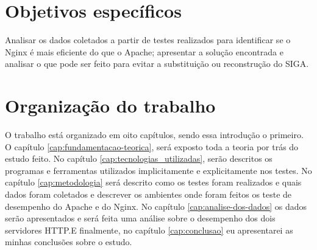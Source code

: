 \section{Objetivos específicos}
Analisar os dados coletados a partir de testes realizados para identificar se o 
Nginx é mais eficiente do que o Apache; apresentar a solução encontrada e 
analisar o que pode ser feito para evitar a substituição ou reconstrução do 
SIGA.\\
\section{Organização do trabalho}
O trabalho está organizado em oito capítulos, sendo essa introdução o primeiro. 
O capítulo \ref{cap:fundamentacao-teorica}, será exposto toda a teoria por trás 
do estudo feito. No capítulo \ref{cap:tecnologias_utilizadas}, serão descritos 
os programas e ferramentas utilizados implicitamente e explicitamente nos 
testes. No capítulo \ref{cap:metodologia} será descrito como os testes foram 
realizados e quais dados foram coletados e descrever os ambientes onde foram 
feitos os teste de desempenho do Apache e do Nginx. No capítulo 
\ref{cap:analise-dos-dados} os dados serão apresentados e 
será feita uma análise sobre o desempenho dos dois servidores HTTP.E 
finalmente, no capítulo \ref{cap:conclusao} eu apresentarei as minhas 
conclusões sobre o estudo.\\
